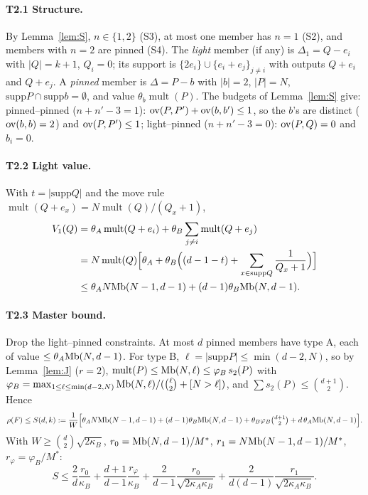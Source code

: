 \documentclass[11pt]{article}
\newcommand{\mult}{\operatorname{mult}}
\theoremstyle{definition}
\theoremstyle{remark}
\begin{document}
\paragraph{T2.1 Structure.} By Lemma~\ref{lem:S}, $n\in\{1,2\}$ (S3), at most one member has $n=1$ (S2), and members with $n=2$ are pinned (S4).
The \emph{light} member (if any) is $\Delta_1=Q-e_i$ with $|Q|=k+1$, $Q_i=0$; its support is $\{2e_i\}\cup\{e_i+e_j\}_{j\ne i}$ with outputs
$Q+e_i$ and $Q+e_j$. A \emph{pinned} member is $\Delta=P-b$ with $|b|=2$, $|P|=N$, $\mathrm{supp}P\cap\mathrm{supp}b=\emptyset$, and value
$\theta_b\mult(P)$. The budgets of Lemma~\ref{lem:S} give: pinned--pinned ($n+n'-3=1$): $\mathrm{ov}(P,P')+\mathrm{ov}(b,b')\le1$, so the $b$'s are distinct
($\mathrm{ov}(b,b)=2$) and $\mathrm{ov}(P,P')\le1$; light--pinned ($n+n'-3=0$): $\mathrm{ov}(P,Q)=0$ and $b_i=0$.

\paragraph{T2.2 Light value.} With $t=|\mathrm{supp}Q|$ and the move rule $\mult(Q+e_x)=N\mult(Q)/(Q_x+1)$,
\begin{align*}
V_1(Q)&=\theta_A\mult(Q+e_i)+\theta_B\sum_{j\ne i}\mult(Q+e_j)\\&=N\mult(Q)\Big[\theta_A+\theta_B\Big((d-1-t)+\sum_{x\in\mathrm{supp}Q}\frac1{Q_x+1}\Big)\Big]\\
&\le\theta_AN\Mb(N-1,d-1)+(d-1)\theta_B\Mb(N,d-1).
\end{align*}

\paragraph{T2.3 Master bound.} Drop the light--pinned constraints. At most $d$ pinned members have type A, each of value $\le\theta_A\mathrm{Mb}(N,d-1)$.
For type B, $\ell=|\mathrm{supp}P|\le\min(d-2,N)$, so by Lemma~\ref{lem:J} ($r=2$),
$\mult(P)\le\Mb(N,\ell)\le\varphi_B\,s_2(P)$ with $\varphi_B=\max_{1\le\ell\le\min(d-2,N)}\mathrm{Mb}(N,\ell)/(\binom\ell2+[N>\ell])$, and
$\sum s_2(P)\le\binom{d+1}2$. Hence
\[
\rho(F)\le S(d,k):=\frac1W\Big[\theta_AN\mathrm{Mb}(N-1,d-1)+(d-1)\theta_B\mathrm{Mb}(N,d-1)+\theta_B\varphi_B\tbinom{d+1}2+d\,\theta_A\mathrm{Mb}(N,d-1)\Big].
\]
With $W\ge\binom d2\sqrt{2\kappa_B}$, $r_0=\mathrm{Mb}(N,d-1)/M^\ast$, $r_1=N\mathrm{Mb}(N-1,d-1)/M^\ast$, $r_\varphi=\varphi_B/M^\ast$:
\begin{equation}\label{eq:T2star}
S\le\frac2d\frac{r_0}{\kappa_B}+\frac{d+1}{d-1}\frac{r_\varphi}{\kappa_B}+\frac2{d-1}\frac{r_0}{\sqrt{2\kappa_A\kappa_B}}+\frac2{d(d-1)}\frac{r_1}{\sqrt{2\kappa_A\kappa_B}}.
\end{equation}
\end{document}

